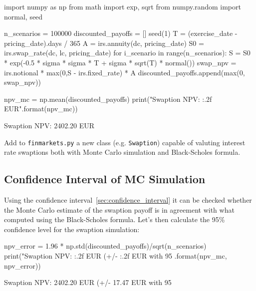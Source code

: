 \begin{ipython}
import numpy as np
from math import exp, sqrt
from numpy.random import normal, seed

n_scenarios = 100000
discounted_payoffs = []
seed(1)
T = (exercise_date - pricing_date).days / 365
A = irs.annuity(dc, pricing_date)
S0 = irs.swap_rate(dc, lc, pricing_date)
for i_scenario in range(n_scenarios):
    S = S0 * exp(-0.5 * sigma * sigma * T +
        sigma * sqrt(T) * normal())
    swap_npv = irs.notional * max(0,S - irs.fixed_rate) * A
    discounted_payoffs.append(max(0, swap_npv))

npv_mc = np.mean(discounted_payoffs)
print("Swaption NPV: {:.2f} EUR".format(npv_mc))
\end{ipython}
\begin{ioutput}
Swaption NPV: 2402.20 EUR
\end{ioutput}

%

\begin{finmarkets}
Add to \texttt{finmarkets.py} a new class (e.g. \texttt{Swaption}) capable of valuting interest rate swaptions both with Monte Carlo simulation and Black-Scholes formula.
\end{finmarkets}

\subsection{Confidence Interval of MC Simulation}

Using the confidence interval~\ref{sec:confidence_interval} it can be checked whether the Monte Carlo estimate of the swaption payoff is in agreement with what computed using the Black-Scholes formula.
Let's then calculate the 95\% confidence level for the swaption simulation:

\begin{ipython}
npv_error = 1.96 * np.std(discounted_payoffs)/sqrt(n_scenarios)
print("Swaption NPV: {:.2f} EUR (+/- {:.2f} EUR with 95%
    .format(npv_mc, npv_error))
\end{ipython}
\begin{ioutput}
Swaption NPV: 2402.20 EUR (+/- 17.47 EUR with 95%
\end{ioutput}


